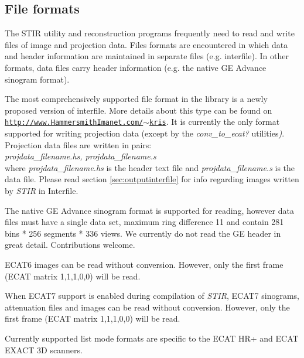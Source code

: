 \documentclass{article}
\def\R2Lurl#1#2{\mbox{\href{#1}{\tt #2}}}
\begin{document}
\subsection{
File formats}

The STIR utility and reconstruction programs frequently need 
to read and write files of image and projection data. Files formats 
are encountered in which data and header information are maintained 
in separate files (e.g. interfile). In other formats, data files 
carry header information (e.g. the native GE Advance sinogram 
format).



The most comprehensively supported file format in the library 
is a newly proposed version of interfile. More details about 
this type can be found on\\
\R2Lurl{http://www.HammersmithImanet.com/\ensuremath{\sim}kris}{http://www.HammersmithImanet.com/\ensuremath{\sim}kris}. 
It is currently the only format supported for writing projection 
data (except by the \textit{conv\_to\_ecat?} utilities\textit{)}. Projection 
data files are written in pairs:\\
\textit{projdata\_filename.hs, 
projdata\_filename.s}\\
where \textit{projdata\_filename.hs} is the header text file and \textit{projdata\_filename.s} 
is the data file. Please read section \ref{sec:outputinterfile} for info regarding 
images written by \textit{STIR} in Interfile.



The native GE Advance sinogram format is supported for reading, 
however data files must have a single data set, maximum ring 
difference 11 and contain 281 bins * 256 segments * 336 views. 
We currently do not read the GE header in great detail. Contributions 
welcome.


 
ECAT6 images can be read without conversion. However, only the 
first frame (ECAT matrix 1,1,1,0,0) will be read.



When ECAT7 support is enabled during compilation of \textit{STIR}, 
ECAT7 sinograms, attenuation files and images can be read without 
conversion. However, only the first frame (ECAT matrix 1,1,1,0,0) 
will be read.



Currently supported list mode formats are specific to the ECAT 
HR+ and ECAT EXACT 3D scanners.
\end{document}
